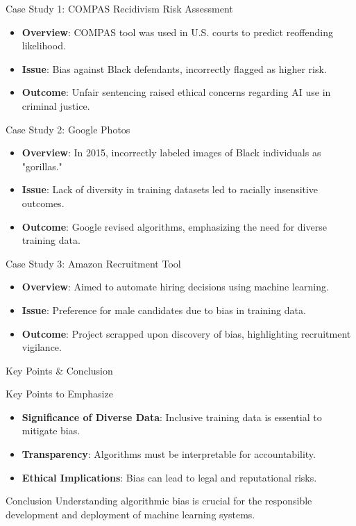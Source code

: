 \documentclass[aspectratio=169]{beamer}
\begin{document}
\begin{frame}[fragile]{Case Study 1: COMPAS Recidivism Risk Assessment}
    \begin{itemize}
        \item \textbf{Overview}: COMPAS tool was used in U.S. courts to predict reoffending likelihood.
        \item \textbf{Issue}: Bias against Black defendants, incorrectly flagged as higher risk.
        \item \textbf{Outcome}: Unfair sentencing raised ethical concerns regarding AI use in criminal justice.
    \end{itemize}
\end{frame}

\begin{frame}[fragile]{Case Study 2: Google Photos}
    \begin{itemize}
        \item \textbf{Overview}: In 2015, incorrectly labeled images of Black individuals as "gorillas."
        \item \textbf{Issue}: Lack of diversity in training datasets led to racially insensitive outcomes.
        \item \textbf{Outcome}: Google revised algorithms, emphasizing the need for diverse training data.
    \end{itemize}
\end{frame}

\begin{frame}[fragile]{Case Study 3: Amazon Recruitment Tool}
    \begin{itemize}
        \item \textbf{Overview}: Aimed to automate hiring decisions using machine learning.
        \item \textbf{Issue}: Preference for male candidates due to bias in training data.
        \item \textbf{Outcome}: Project scrapped upon discovery of bias, highlighting recruitment vigilance.
    \end{itemize}
\end{frame}

\begin{frame}[fragile]{Key Points & Conclusion}
    \begin{block}{Key Points to Emphasize}
        \begin{itemize}
            \item \textbf{Significance of Diverse Data}: Inclusive training data is essential to mitigate bias.
            \item \textbf{Transparency}: Algorithms must be interpretable for accountability.
            \item \textbf{Ethical Implications}: Bias can lead to legal and reputational risks.
        \end{itemize}
    \end{block}

    \begin{block}{Conclusion}
        Understanding algorithmic bias is crucial for the responsible development and deployment of machine learning systems.
    \end{block}
\end{frame}
\end{document}
